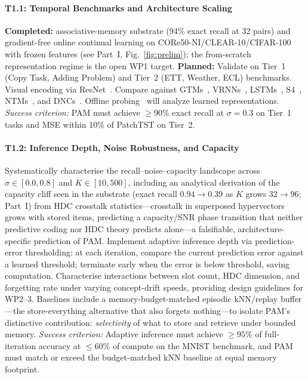 \paragraph{T1.1: Temporal Benchmarks and Architecture Scaling}
\textbf{Completed:} associative-memory substrate (94\% exact recall at 32 pairs) and gradient-free online continual learning on CORe50-NI/CLEAR-10/CIFAR-100 with frozen features (see Part~I, Fig.~\ref{fig:prelim}); the from-scratch representation regime is the open WP1 target.
\textbf{Planned:} Validate on Tier~1 (Copy Task, Adding Problem) and Tier~2 (ETT, Weather, ECL) benchmarks. Visual encoding via ResNet~\cite{he2016resnet}. Compare against GTMs~\cite{gemici2017generative}, VRNNs~\cite{chung2015vrnn}, LSTMs~\cite{hochreiter1997lstm}, S4~\cite{gu2021s4}, NTMs~\cite{graves2014ntm}, and DNCs~\cite{graves2016dnc}. Offline probing~\cite{park2023probing} will analyze learned representations.
\textit{Success criterion:} PAM must achieve ${\ge}90\%$ exact recall at $\sigma{=}0.3$ on Tier~1 tasks and MSE within 10\% of PatchTST on Tier~2.

\paragraph{T1.2: Inference Depth, Noise Robustness, and Capacity}
Systematically characterise the recall--noise--capacity landscape across $\sigma \in [0.0, 0.8]$ and $K \in [10, 500]$, including an analytical derivation of the capacity cliff seen in the substrate (exact recall $0.94{\to}0.39$ as $K$ grows $32{\to}96$; Part~I) from HDC crosstalk statistics---crosstalk in superposed hypervectors grows with stored items, predicting a capacity/SNR phase transition that neither predictive coding nor HDC theory predicts alone---a falsifiable, architecture-specific prediction of PAM. Implement adaptive inference depth via prediction-error thresholding: at each iteration, compare the current prediction error against a learned threshold; terminate early when the error is below threshold, saving computation. Characterise interactions between slot count, HDC dimension, and forgetting rate under varying concept-drift speeds, providing design guidelines for WP2--3. Baselines include a memory-budget-matched episodic kNN/replay buffer---the store-everything alternative that also forgets nothing---to isolate PAM's distinctive contribution: \textit{selectivity} of what to store and retrieve under bounded memory.
\textit{Success criterion:} Adaptive inference must achieve ${\geq}95\%$ of full-iteration accuracy at ${\leq}60\%$ of compute on the MNIST benchmark, and PAM must match or exceed the budget-matched kNN baseline at equal memory footprint.

